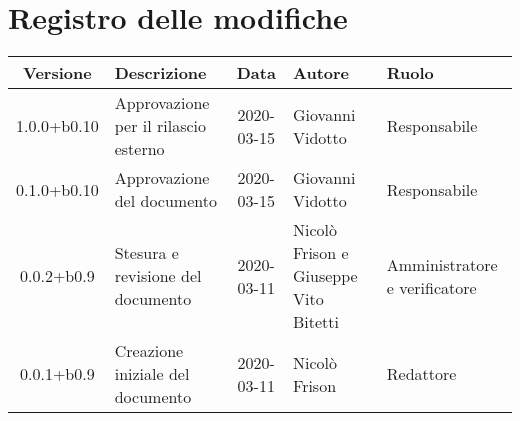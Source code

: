 \section*{Registro delle modifiche}

\begin{center}
	\begin{longtable}{|c|p{3.5cm}|c|p{3cm}|p{3cm}|}
	\hline
	\rowcolor{lighter-grayer}
	\textbf{Versione} & \textbf{Descrizione} & \textbf{Data} & \textbf{Autore} & \textbf{Ruolo} \\
	\hline
	\endfirsthead

	1.0.0+b0.10 & Approvazione per il rilascio esterno & 2020-03-15 & Giovanni Vidotto & Responsabile \\
	\hline
	0.1.0+b0.10 & Approvazione del documento & 2020-03-15 & Giovanni Vidotto & Responsabile \\
	\hline
	0.0.2+b0.9 & Stesura e revisione del documento & 2020-03-11 & Nicolò Frison e Giuseppe Vito Bitetti & Amministratore e verificatore \\
	\hline
	0.0.1+b0.9 & Creazione iniziale del documento & 2020-03-11 & Nicolò Frison & Redattore \\
	\hline

	\end{longtable}
\end{center}